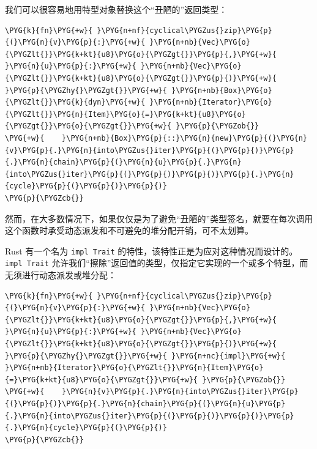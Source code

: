 我们可以很容易地用特型对象替换这个“丑陋的”返回类型：

\begin{Verbatim}[commandchars=\\\{\},breaklines=true,breakanywhere=true,fontsize=\codefont,xleftmargin=17bp]
\PYG{k}{fn}\PYG{+w}{ }\PYG{n+nf}{cyclical\PYGZus{}zip}\PYG{p}{(}\PYG{n}{v}\PYG{p}{:}\PYG{+w}{ }\PYG{n+nb}{Vec}\PYG{o}{\PYGZlt{}}\PYG{k+kt}{u8}\PYG{o}{\PYGZgt{}}\PYG{p}{,}\PYG{+w}{ }\PYG{n}{u}\PYG{p}{:}\PYG{+w}{ }\PYG{n+nb}{Vec}\PYG{o}{\PYGZlt{}}\PYG{k+kt}{u8}\PYG{o}{\PYGZgt{}}\PYG{p}{)}\PYG{+w}{ }\PYG{p}{\PYGZhy{}\PYGZgt{}}\PYG{+w}{ }\PYG{n+nb}{Box}\PYG{o}{\PYGZlt{}}\PYG{k}{dyn}\PYG{+w}{ }\PYG{n+nb}{Iterator}\PYG{o}{\PYGZlt{}}\PYG{n}{Item}\PYG{o}{=}\PYG{k+kt}{u8}\PYG{o}{\PYGZgt{}}\PYG{o}{\PYGZgt{}}\PYG{+w}{ }\PYG{p}{\PYGZob{}}
\PYG{+w}{    }\PYG{n+nb}{Box}\PYG{p}{::}\PYG{n}{new}\PYG{p}{(}\PYG{n}{v}\PYG{p}{.}\PYG{n}{into\PYGZus{}iter}\PYG{p}{(}\PYG{p}{)}\PYG{p}{.}\PYG{n}{chain}\PYG{p}{(}\PYG{n}{u}\PYG{p}{.}\PYG{n}{into\PYGZus{}iter}\PYG{p}{(}\PYG{p}{)}\PYG{p}{)}\PYG{p}{.}\PYG{n}{cycle}\PYG{p}{(}\PYG{p}{)}\PYG{p}{)}
\PYG{p}{\PYGZcb{}}
\end{Verbatim}

然而，在大多数情况下，如果仅仅是为了避免“丑陋的”类型签名，就要在每次调用这个函数时承受动态派发和不可避免的堆分配开销，可不太划算。

Rust 有一个名为 \texttt{impl Trait} 的特性，该特性正是为应对这种情况而设计的。\texttt{impl Trait} 允许我们“擦除”返回值的类型，仅指定它实现的一个或多个特型，而无须进行动态派发或堆分配：

\begin{Verbatim}[commandchars=\\\{\},breaklines=true,breakanywhere=true,fontsize=\codefont,xleftmargin=17bp]
\PYG{k}{fn}\PYG{+w}{ }\PYG{n+nf}{cyclical\PYGZus{}zip}\PYG{p}{(}\PYG{n}{v}\PYG{p}{:}\PYG{+w}{ }\PYG{n+nb}{Vec}\PYG{o}{\PYGZlt{}}\PYG{k+kt}{u8}\PYG{o}{\PYGZgt{}}\PYG{p}{,}\PYG{+w}{ }\PYG{n}{u}\PYG{p}{:}\PYG{+w}{ }\PYG{n+nb}{Vec}\PYG{o}{\PYGZlt{}}\PYG{k+kt}{u8}\PYG{o}{\PYGZgt{}}\PYG{p}{)}\PYG{+w}{ }\PYG{p}{\PYGZhy{}\PYGZgt{}}\PYG{+w}{ }\PYG{n+nc}{impl}\PYG{+w}{ }\PYG{n+nb}{Iterator}\PYG{o}{\PYGZlt{}}\PYG{n}{Item}\PYG{o}{=}\PYG{k+kt}{u8}\PYG{o}{\PYGZgt{}}\PYG{+w}{ }\PYG{p}{\PYGZob{}}
\PYG{+w}{    }\PYG{n}{v}\PYG{p}{.}\PYG{n}{into\PYGZus{}iter}\PYG{p}{(}\PYG{p}{)}\PYG{p}{.}\PYG{n}{chain}\PYG{p}{(}\PYG{n}{u}\PYG{p}{.}\PYG{n}{into\PYGZus{}iter}\PYG{p}{(}\PYG{p}{)}\PYG{p}{)}\PYG{p}{.}\PYG{n}{cycle}\PYG{p}{(}\PYG{p}{)}
\PYG{p}{\PYGZcb{}}
\end{Verbatim}

